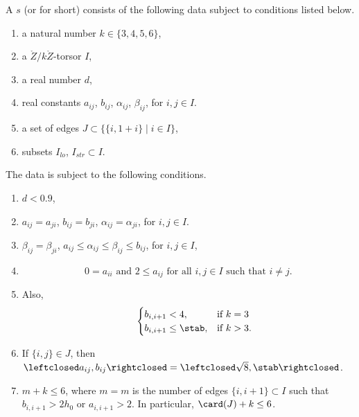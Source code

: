 \begin{definition}
%
A  $s$ (or  for short)
consists of the following data subject
to conditions listed below.
\begin{enumerate}
\item a natural number $k\in \{3,4,5,6\}$,
\item a $\ring{Z}/k\ring{Z}$-torsor $I$,
\item a real number $d$,
\item real constants $a_{ij}$, $b_{ij}$, $\alpha_{ij}$, $\beta_{ij}$, for $i,j\in I$.
\item a set of edges $J\subset \{ \{i,1+i\} \mid i\in I\}$, 
\item subsets $I_{lo}$, $I_{str} \subset I$.
\end{enumerate}
The data is subject to the following conditions.
\begin{enumerate}
\item $d < 0.9$,
\item 
   $a_{ij} = a_{ji}$, $b_{ij}=b_{ji}$, $\alpha_{ij}=\alpha_{ji}$, for $i,j\in I$.
\item 
$\beta_{ij}= \beta_{ji}$,  $a_{ij}\le \alpha_{ij}\le \beta_{ij}\le b_{ij}$,
 for $i,j\in I$,
\item 
\[
0 = a_{ii}\text{ and } 2\le a_{ij} \text{ for all }  i,j\in I \text{ such that } i\ne j.
\]  
\item
  Also, 
\[
   ~\quad \begin{cases}
    b_{i,i+1} < 4, & \text{if } k = 3\\
    b_{i,i+1}\le \stab, & \text{if } k > 3.
    \end{cases}
\]  
\item
If $\{i,j\}\in J$, then $\leftclosed
  a_{ij},b_{ij}\rightclosed=\leftclosed\sqrt{8},\stab\rightclosed$.
\item  $m+k\le 6$, where 
$m=m$ is the number of edges $\{i,i+1\}\subset I$ such that
$b_{i ,i+1}> 2h_0$ or $a_{i ,i+1}>2$. In particular, $\card(J)+k\le 6$.
\end{enumerate}
%
%
\end{definition}

